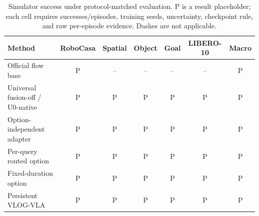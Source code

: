 \begin{table}[t]
\centering
\small
\setlength{\tabcolsep}{4pt}
\begin{tabular}{lcccccc}
\toprule
Method & RoboCasa & Spatial & Object & Goal & LIBERO-10 & Macro \\
\midrule
Official flow base & P & -- & -- & -- & -- & P \\
Universal fusion-off / U0-native & P & P & P & P & P & P \\
Option-independent adapter & P & P & P & P & P & P \\
Per-query routed option & P & P & P & P & P & P \\
Fixed-duration option & P & P & P & P & P & P \\
Persistent VLOG-VLA & P & P & P & P & P & P \\
\bottomrule
\end{tabular}
\caption{Simulator success under protocol-matched evaluation.  P is a result
placeholder; each cell requires successes/episodes, training seeds, uncertainty,
checkpoint rule, and raw per-episode evidence.  Dashes are not applicable.}
\label{tab:main-results}
\end{table}
